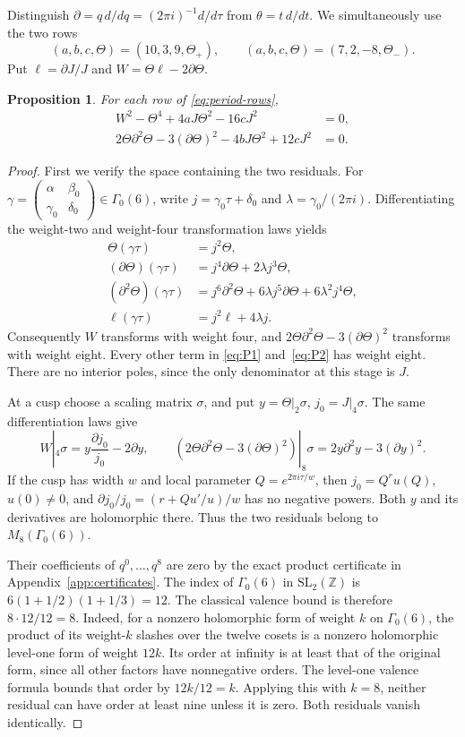 \documentclass[11pt,a4paper]{article}
\newtheorem{proposition}[theorem]{Proposition}
\theoremstyle{remark}\newtheorem{remark}[theorem]{Remark}
\newcommand{\Z}{\mathbb Z}\newcommand{\Q}{\mathbb Q}
\newcommand{\dd}{\partial}\newcommand{\Tp}{\mathcal T_p}
\newcommand{\smat}[4]{\begin{pmatrix}#1&#2\\#3&#4\end{pmatrix}}
\begin{document}
Distinguish $\dd=q\,d/dq=(2\pi i)^{-1}d/d\tau$ from $\theta=t\,d/dt$.
We simultaneously use the two rows
\begin{equation}\label{eq:period-rows}
 (a,b,c,\Theta)=(10,3,9,\Theta_+),\qquad
 (a,b,c,\Theta)=(7,2,-8,\Theta_-).
\end{equation}
Put $\ell=\dd J/J$ and $W=\Theta\ell-2\dd\Theta$.
\begin{proposition}\label{prop:P}
For each row of \eqref{eq:period-rows},
\begin{align}
 W^2-\Theta^4+4aJ\Theta^2-16cJ^2&=0,\label{eq:P1}\\
 2\Theta\dd^2\Theta-3(\dd\Theta)^2
       -4bJ\Theta^2+12cJ^2&=0.\label{eq:P2}
\end{align}
\end{proposition}
\begin{proof}
First we verify the space containing the two residuals.
For $\gamma=\smat{\alpha}{\beta_0}{\gamma_0}{\delta_0}\in\Gamma_0(6)$,
write $j=\gamma_0\tau+\delta_0$ and $\lambda=\gamma_0/(2\pi i)$.
Differentiating the weight-two and weight-four transformation laws yields
\begin{align*}
 \Theta(\gamma\tau)&=j^2\Theta,\\
 (\dd\Theta)(\gamma\tau)&=j^4\dd\Theta+2\lambda j^3\Theta,\\
 (\dd^2\Theta)(\gamma\tau)&=j^6\dd^2\Theta
             +6\lambda j^5\dd\Theta+6\lambda^2j^4\Theta,\\
 \ell(\gamma\tau)&=j^2\ell+4\lambda j.
\end{align*}
Consequently $W$ transforms with weight four, and
$2\Theta\dd^2\Theta-3(\dd\Theta)^2$ transforms with weight eight.
Every other term in \eqref{eq:P1} and~\eqref{eq:P2} has weight eight.
There are no interior poles, since the only denominator at this stage is $J$.

At a cusp choose a scaling matrix $\sigma$, and put
$y=\Theta|_2\sigma$, $j_0=J|_4\sigma$.
The same differentiation laws give
\[
 W|_4\sigma=y\frac{\dd j_0}{j_0}-2\dd y,
 \qquad
 (2\Theta\dd^2\Theta-3(\dd\Theta)^2)|_8\sigma
 =2y\dd^2y-3(\dd y)^2.
\]
If the cusp has width $w$ and local parameter $Q=e^{2\pi i\tau/w}$,
then $j_0=Q^r u(Q)$, $u(0)\ne0$, and
$\dd j_0/j_0=(r+Qu'/u)/w$ has no negative powers.
Both $y$ and its derivatives are holomorphic there. Thus the two
residuals belong to $M_8(\Gamma_0(6))$.

Their coefficients of $q^0,\ldots,q^8$ are zero by the exact product
certificate in Appendix~\ref{app:certificates}.
The index of $\Gamma_0(6)$ in $\mathrm{SL}_2(\Z)$ is
$6(1+1/2)(1+1/3)=12$. The classical valence bound is therefore
$8\cdot12/12=8$. Indeed, for a nonzero holomorphic form of weight $k$ on
$\Gamma_0(6)$, the product of its weight-$k$ slashes over the twelve
cosets is a nonzero holomorphic level-one form of weight $12k$.
Its order at infinity is at least that of the original form, since all
other factors have nonnegative orders. The level-one valence formula
bounds that order by $12k/12=k$. Applying this with $k=8$, neither
residual can have order at least nine unless it is zero. Both residuals
vanish identically.
\end{proof}
\end{document}
